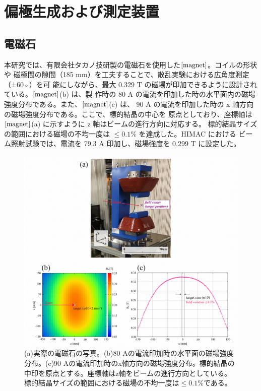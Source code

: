 \section{偏極生成および測定装置}
\subsection{電磁石}
本研究では、有限会社タカノ技研製の電磁石を使用した$\ref{magnet}$。コイルの形状や
磁極間の隙間（185 mm）を工夫することで、散乱実験における広角度測定（±60◦）を可
能にしながら、最大 0.329 T の磁場が印加できるように設計されている。$\ref{magnet}$(b) は、製
作時の 80 A の電流を印加した時の水平面内の磁場強度分布である。また、$\ref{magnet}$(c) は、
90 A の電流を印加した時の x 軸方向の磁場強度分布である。ここで、標的結晶の中心を
原点としており、座標軸は$\ref{magnet}$(a) に示すように z 軸はビームの進行方向に対応する。
標的結晶サイズの範囲における磁場の不均一度は $\leq0.1\%$ を達成した。HIMAC における
ビーム照射試験では、電流を 79.3 A 印加し、磁場強度を 0.299 T に設定した。

\begin{figure}[ht]
  \centering
  \includegraphics[keepaspectratio, scale=0.8]
       {./chap2/fig/magnet.png}
  \caption{(a)実際の電磁石の写真。(b)80 Aの電流印加時の水平面の磁場強度分布。(c)90 Aの電流印加時のx軸方向の磁場強度分布。標的結晶の中印を原点とする。座標軸はz軸をビームの進行方向としている。標的結晶サイズの範囲における磁場の不均一度は$\leq0.1\%$である。}
  \label{magnet}
 \end{figure}

